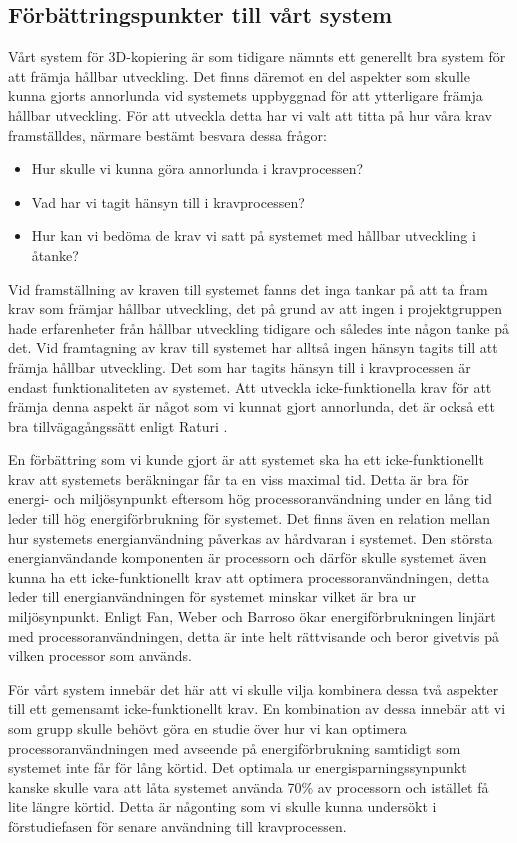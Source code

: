 \subsection{Förbättringspunkter till vårt system}
Vårt system för 3D-kopiering är som tidigare nämnts ett generellt bra system för att främja hållbar utveckling. Det finns däremot en del aspekter som skulle kunna gjorts annorlunda vid systemets uppbyggnad för att ytterligare främja hållbar utveckling. För att utveckla detta har vi valt att titta på hur våra krav framställdes, närmare bestämt besvara dessa frågor:

\begin{itemize}
	\item Hur skulle vi kunna göra annorlunda i kravprocessen?
	\item Vad har vi tagit hänsyn till i kravprocessen?
	\item Hur kan vi bedöma de krav vi satt på systemet med hållbar utveckling i åtanke?
\end{itemize}
Vid framställning av kraven till systemet fanns det inga tankar på att ta fram krav som främjar hållbar utveckling, det på grund av att ingen i projektgruppen hade erfarenheter från hållbar utveckling tidigare och således inte någon tanke på det. Vid framtagning av krav till systemet har alltså ingen hänsyn tagits till att främja hållbar utveckling. Det som har tagits hänsyn till i kravprocessen är endast funktionaliteten av systemet. Att utveckla icke-funktionella krav för att främja denna aspekt är något som vi kunnat gjort annorlunda, det är också ett bra tillvägagångssätt enligt Raturi \cite{raturi2014developing}. 

En förbättring som vi kunde gjort är att systemet ska ha ett icke-funktionellt krav att systemets beräkningar får ta en viss maximal tid. Detta är bra för energi- och miljösynpunkt eftersom hög processoranvändning under en lång tid leder till hög energiförbrukning för systemet. Det finns även en relation mellan hur systemets energianvändning påverkas av hårdvaran i systemet. Den största energianvändande komponenten är processorn och därför skulle systemet även kunna ha ett icke-funktionellt krav att optimera processoranvändningen, detta leder till energianvändningen för systemet minskar vilket är bra ur miljösynpunkt. Enligt Fan, Weber och Barroso \cite{fan2007power} ökar energiförbrukningen linjärt med processoranvändningen, detta är inte helt rättvisande och beror givetvis på vilken processor som används. 

För vårt system innebär det här att vi skulle vilja kombinera dessa två aspekter till ett gemensamt icke-funktionellt krav. En kombination av dessa innebär att vi som grupp skulle behövt göra en studie över hur vi kan optimera processoranvändningen med avseende på energiförbrukning samtidigt som systemet inte får för lång körtid. Det optimala ur energisparningssynpunkt kanske skulle vara att låta systemet använda 70\% av processorn och istället få lite längre körtid. Detta är någonting som vi skulle kunna undersökt i förstudiefasen för senare användning till kravprocessen.

